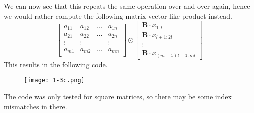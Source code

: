 \documentclass{article}
\begin{document}
\pagebreak

\noindent We can now see that this repeats the same operation over and over again, hence we would rather compute the following matrix-vector-like product instead.
\begin{equation*}
    \begin{bmatrix}
        a_{11} & a_{12} & \dots & a_{1n} \\
        a_{21} & a_{22} & \dots & a_{2n} \\
        \vdots & \vdots & & \vdots \\
        a_{m1} & a_{m2} & \dots & a_{mn} \\
    \end{bmatrix}
    \odot
    \begin{bmatrix}
        \mathbf{B}\cdot x_{1:l} \\
        \mathbf{B}\cdot x_{l+1:2l} \\
        \vdots \\
        \mathbf{B}\cdot x_{\left(m-1\right)l +1:ml}
    \end{bmatrix}
\end{equation*}
This results in the following code.
\begin{figure}[!hbt]
    \centering
\texttt{[image: 1-3c.png]}
\end{figure}
The code was only tested for square matrices, so there may be some index mismatches in there.
\end{document}
